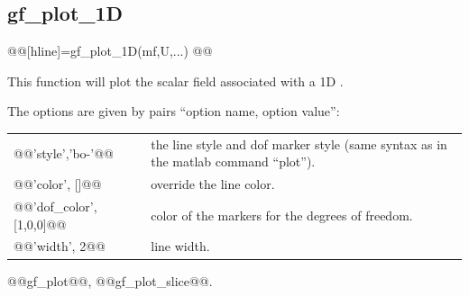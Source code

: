 \subsection{gf\_plot_1D}
\begin{synopsis}
@@[hline]=gf_plot_1D(mf,U,...)
@@\end{synopsis}
\begin{cmddescription}
  This function will plot the scalar field associated with a 1D \mf.

  The options are given by pairs ``option name, option value'': 
\begin{center}
\begin{tabular}{|lp{}|}
  \hline
  @@'style','bo-'@@ &      the line style and dof marker style (same
  syntax as in the matlab command ``plot'').\\
  @@'color', []@@         & override the line color.\\
  @@'dof_color', [1,0,0]@@  & color of the markers for the degrees of freedom.\\
  @@'width', 2@@          & line width.\\
  \hline
\end{tabular}
\end{center}

\end{cmddescription}
\begin{gfseealso}
  @@gf\_plot@@, @@gf_plot_slice@@.
\end{gfseealso}
\newpage


